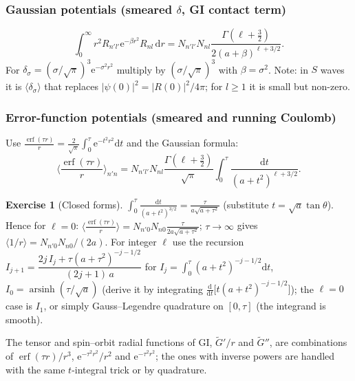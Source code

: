 \documentclass[11pt,a4paper]{article}
\numberwithin{equation}{section}
\theoremstyle{definition}
\newtheorem{exercise}[definition]{Exercise}
\theoremstyle{plain}
\theoremstyle{remark}
\numberwithin{algorithm}{section}
\newcommand{\dd}{\mathrm{d}}
\newcommand{\ee}{\mathrm{e}}
\newcommand{\erf}{\operatorname{erf}}
\begin{document}
\subsubsection{\texorpdfstring{Gaussian potentials (smeared $\delta$, GI contact term)}{Gaussian potentials}}
\begin{equation}
\int_0^\infty r^2R_{n'l'}\ee^{-\beta r^2}R_{nl}\,\dd r=N_{n'l'}N_{nl}\frac{\Gamma(\ell+\frac32)}{2(a+\beta)^{\ell+3/2}} .
\end{equation}
For $\delta_\sigma=(\sigma/\sqrt\pi)^3\ee^{-\sigma^2r^2}$ multiply by $(\sigma/\sqrt\pi)^3$ with $\beta=\sigma^2$. Note: in $S$ waves it is $\langle\delta_\sigma\rangle$ that replaces $|\psi(0)|^2=|R(0)|^2/4\pi$; for $l\ge1$ it is small but non-zero.

\subsubsection{Error-function potentials (smeared and running Coulomb)}
Use $\frac{\erf(\tau r)}{r}=\frac2{\sqrt\pi}\int_0^\tau\ee^{-t^2r^2}\dd t$ and the Gaussian formula:
\begin{equation}
\Big\langle\frac{\erf(\tau r)}{r}\Big\rangle_{n'n}=N_{n'l'}N_{nl}\frac{\Gamma(\ell+\frac32)}{\sqrt\pi}\int_0^\tau\frac{\dd t}{(a+t^2)^{\ell+3/2}} .
\end{equation}
\begin{exercise}[Closed forms]
$\int_0^\tau\frac{\dd t}{(a+t^2)^{3/2}}=\frac{\tau}{a\sqrt{a+\tau^2}}$ (substitute $t=\sqrt a\tan\theta$). Hence for $\ell=0$: $\big\langle\frac{\erf(\tau r)}{r}\big\rangle=N_{n'0}N_{n0}\frac{\tau}{2a\sqrt{a+\tau^2}}$; $\tau\to\infty$ gives $\langle1/r\rangle=N_{n'0}N_{n0}/(2a)$. For integer $\ell$ use the recursion $I_{j+1}=\dfrac{2j\,I_j+\tau(a+\tau^2)^{-j-1/2}}{(2j+1)\,a}$ for $I_j=\int_0^\tau(a+t^2)^{-j-1/2}\dd t$, $I_0=\operatorname{arsinh}(\tau/\sqrt a)$ (derive it by integrating $\frac{\dd}{\dd t}\big[t(a+t^2)^{-j-1/2}\big]$); the $\ell=0$ case is $I_1$, or simply Gauss--Legendre quadrature on $[0,\tau]$ (the integrand is smooth).
\end{exercise}
The tensor and spin--orbit radial functions of GI, $\tilde G'/r$ and $\tilde G''$, are combinations of $\erf(\tau r)/r^3$, $\ee^{-\tau^2r^2}/r^2$ and $\ee^{-\tau^2r^2}$; the ones with inverse powers are handled with the same $t$-integral trick or by quadrature.
\end{document}
